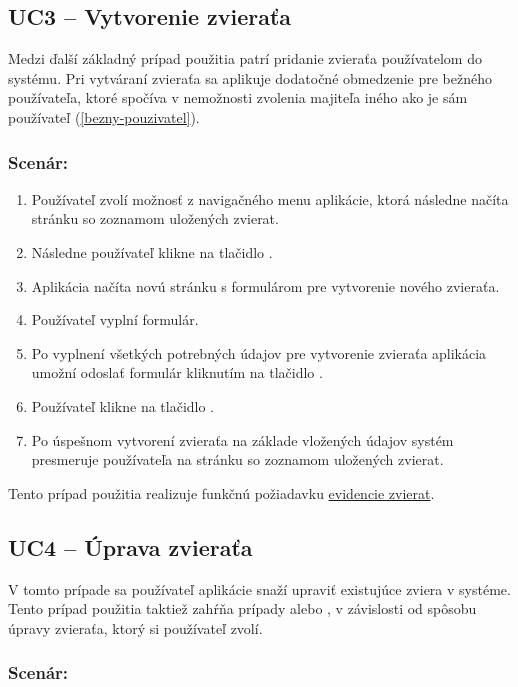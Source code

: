 \subsection*{UC3 -- Vytvorenie zvieraťa}

Medzi ďalší základný prípad použitia patrí pridanie zvieraťa používatelom do systému.
Pri vytváraní zvieraťa sa aplikuje dodatočné obmedzenie pre bežného používateľa, ktoré spočíva v nemožnosti zvolenia majiteľa iného ako je sám používateľ (\ref{bezny-pouzivatel}).

\subsubsection*{Scenár:}

\begin{enumerate}
	\item Používateľ zvolí možnosť  z navigačného menu aplikácie, ktorá následne načíta stránku so zoznamom uložených zvierat.
	\item Následne používateľ klikne na tlačidlo .
	\item Aplikácia načíta novú stránku s formulárom pre vytvorenie nového zvieraťa.
	\item Používateľ vyplní formulár.
	\item Po vyplnení všetkých potrebných údajov pre vytvorenie zvieraťa aplikácia umožní odoslať formulár kliknutím na tlačidlo .
	\item Používateľ klikne na tlačidlo .
	\item Po úspešnom vytvorení zvieraťa na základe vložených údajov systém presmeruje používateľa na stránku so zoznamom uložených zvierat.
\end{enumerate}

Tento prípad použitia realizuje funkčnú požiadavku \hyperref[evidencia-zvierat]{evidencie zvierat}.

\subsection*{UC4 -- Úprava zvieraťa}

V tomto prípade sa používateľ aplikácie snaží upraviť existujúce zviera v systéme. Tento prípad použitia taktiež zahŕňa prípady 
 alebo , v závislosti od spôsobu úpravy zvieraťa, ktorý si používateľ zvolí.

\subsubsection*{Scenár:}

